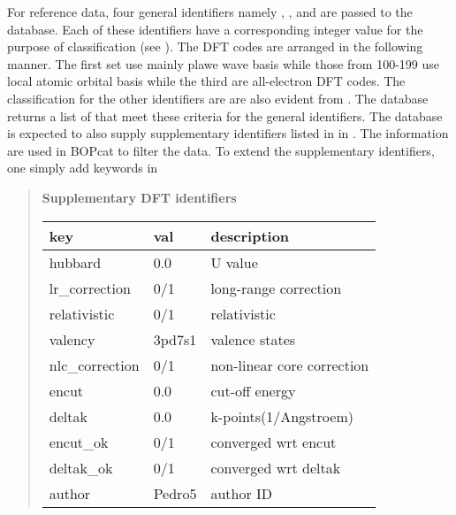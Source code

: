 \documentclass[letterpaper,10pt,english]{sphinxmanual}
\begin{document}
For  reference data, four general identifiers namely , ,
 and  are passed to the database. Each of these
identifiers have a corresponding integer value for the purpose of
classification (see {\hyperref[refdata:general\string-dft\string-identifiers]{}}). The DFT codes are arranged
in the following manner. The first set use mainly plawe wave basis while those
from 100-199 use local atomic
orbital basis while the third are all-electron DFT codes. The classification for the
other identifiers are are also evident from {\hyperref[refdata:general\string-dft\string-identifiers]{}}. The database
returns a list of  that meet these criteria for the general identifiers.
The database is expected to also supply supplementary identifiers listed in {\hyperref[refdata:supplementary\string-dft\string-identifiers]{}}
in . The information are used in BOPcat to filter the data. To extend
the supplementary identifiers, one simply add keywords in 
\label{refdata:supplementary-dft-identifiers}\begin{quote}

\textbf{Supplementary DFT identifiers}

\begin{tabulary}{\linewidth}{|L|L|L|}
\hline
\textsf{\relax 
key
} & \textsf{\relax 
val
} & \textsf{\relax 
description
}\\
\hline
hubbard
 & 
0.0
 & 
U value
\\
\hline
lr\_correction
 & 
0/1
 & 
long-range correction
\\
\hline
relativistic
 & 
0/1
 & 
relativistic
\\
\hline
valency
 & 
3pd7s1
 & 
valence states
\\
\hline
nlc\_correction
 & 
0/1
 & 
non-linear core correction
\\
\hline
encut
 & 
0.0
 & 
cut-off energy
\\
\hline
deltak
 & 
0.0
 & 
k-points(1/Angstroem)
\\
\hline
encut\_ok
 & 
0/1
 & 
converged wrt encut
\\
\hline
deltak\_ok
 & 
0/1
 & 
converged wrt deltak
\\
\hline
author
 & 
Pedro5
 & 
author ID
\\
\hline\end{tabulary}

\end{quote}
\end{document}
